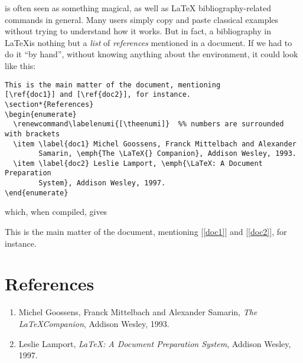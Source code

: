 %
%
%

\label{part1}
\parttoc
\mtcskip

\bt is often seen as something magical, as well as \LaTeX
bibliography-related commands in general. Many users simply copy and paste
classical examples without trying to understand how it works. But in
fact, a bibliography in \LaTeX is nothing but a \emph{list} of
\emph{references} mentioned in a document. If we had to do it ``by
hand'', 
without knowing anything about the  environment,
it could look like this:

\medskip
\begin{verbatim}
This is the main matter of the document, mentioning 
[\ref{doc1}] and [\ref{doc2}], for instance.
\section*{References}
\begin{enumerate}
  \renewcommand\labelenumi{[\theenumi]}  %% numbers are surrounded with brackets
  \item \label{doc1} Michel Goossens, Franck Mittelbach and Alexander
        Samarin, \emph{The \LaTeX{} Companion}, Addison Wesley, 1993.
  \item \label{doc2} Leslie Lamport, \emph{\LaTeX: A Document Preparation
        System}, Addison Wesley, 1997.
\end{enumerate}
\end{verbatim}
\noindent which, when compiled, gives
\begin{myex}
This is the main matter of the document, mentioning 
[\ref{doc1}] and [\ref{doc2}], for instance.
\section*{References}
\begin{enumerate}
  \renewcommand\labelenumi{[\theenumi]}  %
  \item \label{doc1} Michel Goossens, Franck Mittelbach and Alexander
        Samarin, \emph{The \LaTeX Companion}, Addison Wesley, 1993.
  \item \label{doc2} Leslie Lamport, \emph{\LaTeX: A Document Preparation
        System}, Addison Wesley, 1997.
\end{enumerate}
\end{myex}

